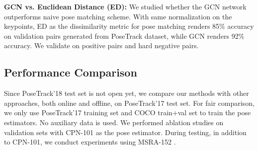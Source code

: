 \documentclass[10pt,twocolumn,letterpaper]{article}
\begin{document}
	
\noindent\textbf{GCN vs. Euclidean Distance (ED):} We studied whether the GCN network outperforms naive pose matching scheme. With same normalization on the keypoints, ED as the dissimilarity metric for pose matching renders 85\% accuracy on validation pairs generated from PoseTrack dataset, while GCN renders 92\% accuracy. 
	We validate on positive pairs and hard negative pairs.


	
	\subsection{Performance Comparison}
	\label{sec:comparison}
	Since PoseTrack'18 test set is not open yet, we compare our methods with other approaches, both online and offline, on PoseTrack'17 test set. 
	For fair comparison, we only use PoseTrack'17 training set and COCO train+val set to train the pose estimators. No auxiliary data is used. 
	We performed ablation studies on validation sets with CPN-101 \cite{chen2017cascaded} as the pose estimator. During testing, in addition to CPN-101, we conduct experiments using MSRA-152 \cite{xiao2018simple}.
	
\end{document}
